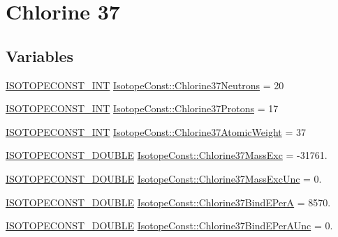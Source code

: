 \hypertarget{group___isotope_const-_chlorine-_cl37}{}\section{Chlorine 37}
\label{group___isotope_const-_chlorine-_cl37}
\subsection*{Variables}
\begin{DoxyCompactItemize}
\item 
\mbox{\hyperlink{group___isotope_const-_macros_ga5f18360b3e99483a35c32d789e62621c}{I\+S\+O\+T\+O\+P\+E\+C\+O\+N\+S\+T\+\_\+\+I\+NT}} \mbox{\hyperlink{group___isotope_const-_chlorine-_cl37_gae0b2c98606416c294ca4c95a306b9f60}{Isotope\+Const\+::\+Chlorine37\+Neutrons}} = 20
\item 
\mbox{\hyperlink{group___isotope_const-_macros_ga5f18360b3e99483a35c32d789e62621c}{I\+S\+O\+T\+O\+P\+E\+C\+O\+N\+S\+T\+\_\+\+I\+NT}} \mbox{\hyperlink{group___isotope_const-_chlorine-_cl37_ga46cdcb6eac64fffafc2d156667f805dd}{Isotope\+Const\+::\+Chlorine37\+Protons}} = 17
\item 
\mbox{\hyperlink{group___isotope_const-_macros_ga5f18360b3e99483a35c32d789e62621c}{I\+S\+O\+T\+O\+P\+E\+C\+O\+N\+S\+T\+\_\+\+I\+NT}} \mbox{\hyperlink{group___isotope_const-_chlorine-_cl37_gac2fd280d38c97d78eeded8cdf9545e01}{Isotope\+Const\+::\+Chlorine37\+Atomic\+Weight}} = 37
\item 
\mbox{\hyperlink{group___isotope_const-_macros_ga8f45a7272ce02c0b4c65c44636ed719a}{I\+S\+O\+T\+O\+P\+E\+C\+O\+N\+S\+T\+\_\+\+D\+O\+U\+B\+LE}} \mbox{\hyperlink{group___isotope_const-_chlorine-_cl37_ga70407e79c3c8c1b8343953fd98a1e155}{Isotope\+Const\+::\+Chlorine37\+Mass\+Exc}} = -\/31761.
\item 
\mbox{\hyperlink{group___isotope_const-_macros_ga8f45a7272ce02c0b4c65c44636ed719a}{I\+S\+O\+T\+O\+P\+E\+C\+O\+N\+S\+T\+\_\+\+D\+O\+U\+B\+LE}} \mbox{\hyperlink{group___isotope_const-_chlorine-_cl37_ga59a18a143782466d2af6e4449a3cc909}{Isotope\+Const\+::\+Chlorine37\+Mass\+Exc\+Unc}} = 0.
\item 
\mbox{\hyperlink{group___isotope_const-_macros_ga8f45a7272ce02c0b4c65c44636ed719a}{I\+S\+O\+T\+O\+P\+E\+C\+O\+N\+S\+T\+\_\+\+D\+O\+U\+B\+LE}} \mbox{\hyperlink{group___isotope_const-_chlorine-_cl37_ga3c8221b4833e187e447bc20184ef0319}{Isotope\+Const\+::\+Chlorine37\+Bind\+E\+PerA}} = 8570.
\item 
\mbox{\hyperlink{group___isotope_const-_macros_ga8f45a7272ce02c0b4c65c44636ed719a}{I\+S\+O\+T\+O\+P\+E\+C\+O\+N\+S\+T\+\_\+\+D\+O\+U\+B\+LE}} \mbox{\hyperlink{group___isotope_const-_chlorine-_cl37_gac208e3da6f6400e70a7916484ed41ee2}{Isotope\+Const\+::\+Chlorine37\+Bind\+E\+Per\+A\+Unc}} = 0.

\end{DoxyCompactItemize}
